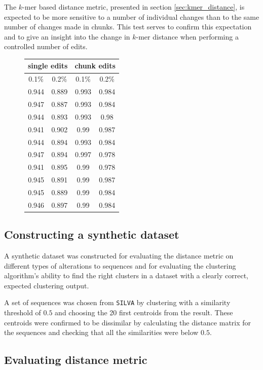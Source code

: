 The $k$-mer based distance metric, presented in section
\ref{sec:kmer_distance}, is expected to be more sensitive to a number of
individual changes than to the same number of changes made in chunks. This test
serves to confirm this expectation and to give an insight into the change in
$k$-mer distance when performing a controlled number of edits.

\begin{figure}[H]
  \centering
\begin{tabular}{c|c||c|c}
  \multicolumn{2}{c||}{single edits} & \multicolumn{2}{c}{chunk edits} \\
  \hline\hline
  0.1\%   &   0.2\%                 &   0.1\%   &   0.2\%             \\
  \hline
  0.944 & 0.889 & 0.993 & 0.984 \\
  0.947 & 0.887 & 0.993 & 0.984 \\
  0.944 & 0.893 & 0.993 & 0.98  \\
  0.941 & 0.902 & 0.99  & 0.987 \\
  0.944 & 0.894 & 0.993 & 0.984 \\
  0.947 & 0.894 & 0.997 & 0.978 \\
  0.941 & 0.895 & 0.99  & 0.978 \\
  0.945 & 0.891 & 0.99  & 0.987 \\
  0.945 & 0.889 & 0.99  & 0.984 \\
  0.946 & 0.897 & 0.99  & 0.984
\end{tabular}
\end{figure}


\subsection{Constructing a synthetic dataset}

A synthetic dataset was constructed for evaluating the distance metric on
different types of alterations to sequences and for evaluating the clustering
algorithm's ability to find the right clusters in a dataset with a clearly
correct, expected clustering output.

A set of sequences was chosen from \texttt{SILVA} by clustering with a
similarity threshold of $0.5$ and choosing the 20 first centroids from the
result. These centroids were confirmed to be dissimilar by calculating the
distance matrix for the sequences and checking that all the similarities were
below $0.5$.


\subsection{Evaluating distance metric}

